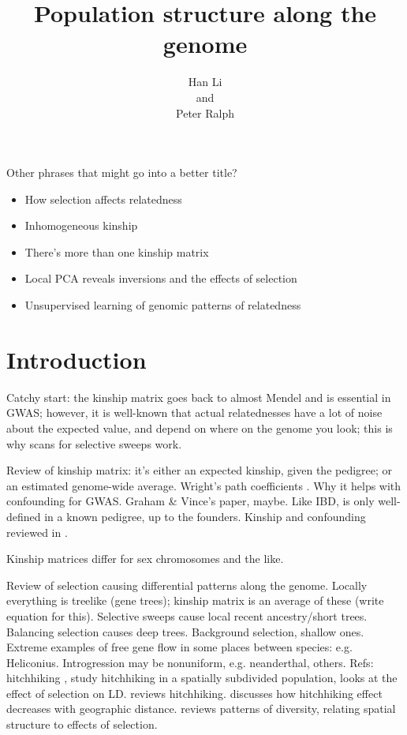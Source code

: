 \documentclass{article}
\title{Population structure along the genome}
\author{
Han Li
\\and\\
Peter Ralph
}
\begin{document}
Other phrases that might go into a better title?
\begin{itemize}
    \item How selection affects relatedness
    \item Inhomogeneous kinship
    \item There's more than one kinship matrix
    \item Local PCA reveals inversions and the effects of selection
    \item Unsupervised learning of genomic patterns of relatedness
\end{itemize}


\section{Introduction}


Catchy start: the kinship matrix goes back to almost Mendel and is essential in GWAS;
however, it is well-known that actual relatednesses have a lot of noise about the expected value,
and depend on where on the genome you look;
this is why scans for selective sweeps work.

Review of kinship matrix: 
it's either an expected kinship, given the pedigree;
or an estimated genome-wide average.
Wright's path coefficients \citep{wright1943isolation}.
Why it helps with confounding for GWAS.
Graham \& Vince's paper, maybe.
Like IBD, is only well-defined in a known pedigree, up to the founders.
Kinship and confounding reviewed in \citet{astle2009population}.

Kinship matrices differ for sex chromosomes and the like.

Review of selection causing differential patterns along the genome.
Locally everything is treelike (gene trees);
kinship matrix is an average of these (write equation for this).
Selective sweeps cause local recent ancestry/short trees.
Balancing selection causes deep trees.
Background selection, shallow ones.
Extreme examples of free gene flow in some places between species: e.g. Heliconius.
Introgression may be nonuniform, e.g. neanderthal, others.
Refs: hitchhiking \citep{maynardsmith1974hitchhiking},
\citet{kim2011hitchhiking} study hitchhiking in a spatially subdivided population,
\citet{mcvean2007structure} looks at the effect of selection on LD.
\citet{barton2000genetic} reviews hitchhiking.
\citet{bierne2010distinctive} discusses how hitchhiking effect decreases with geographic distance.
\citet{charlesworth2003review} reviews patterns of diversity, relating spatial structure to effects of selection.
\end{document}
